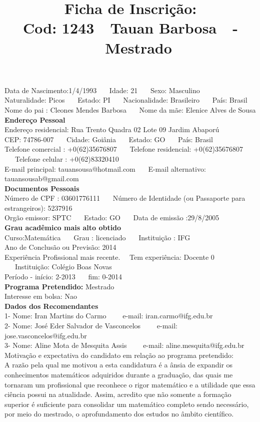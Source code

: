 \documentclass[11pt]{article}
\title{\vspace*{-4cm} Ficha de Inscrição: \\Cod: 1243\ \ Tauan Barbosa\ \ - \ \ Mestrado 
 }
\date{}
\begin{document}
\maketitle
\vspace*{-1.5cm}
\noindent Data de Nascimento:1/4/1993
\ \ \ Idade: 21   \ \ \ Sexo: Masculino
\\
Naturalidade: Picos   
\ \ \  Estado: PI
\ \ \  Nacionalidade: Brasileiro
\ \ \ País: Brasil
\\        
Nome do pai : Cleones Mendes Barbosa
\ \ \ Nome da mãe: Elenice Alves de Sousa          
\\[0.2cm]                     
\textbf{Endereço Pessoal} 
\\ 
\noindent Endereço residencial: Rua Trento Quadra 02 Lote 09 Jardim Abaporú
\\
        CEP: 74786-007 
\ \ \ Cidade: Goiânia 
\ \ \ Estado: GO 
\ \ \ País: Brasil
\\		
		Telefone comercial : +0(62)35676807
\ \ \ Telefone residencial: +0(62)35676807
\ \ \ Telefone celular : +0(62)83320410
\\
E-mail principal: tauansousa@hotmail.com
\ \ \ E-mail alternativo: tauansousab@gmail.com 
\\[0.2cm] 
\textbf{Documentos Pessoais}
\\
\noindent Número de CPF : 03601776111
\ \ \ Número de Identidade (ou Passaporte para estrangeiros): 5237916
\\
Orgão emissor: SPTC
\ \ \ Estado: GO
\ \ \ Data de emissão :29/8/2005
\\[0.3cm]
\textbf{Grau acadêmico mais alto obtido}
\\	
Curso:Matemática
\ \ \ Grau : licenciado
\ \ \ Instituição : IFG
\\			
Ano de Conclusão ou Previsão: 2014
\\ 
Experiência Profissional mais recente. \ \  
Tem experiência: Docente 0  
\ \ \ Instituição: Colégio Boas Novas
\\  
Período - início: 2-2013
\ \ \ fim: 0-2014
\\[0.2cm] 
\textbf{Programa Pretendido:} Mestrado\\
Interesse em bolsa: Nao
\\[0.3cm]		
\textbf{Dados dos Recomendantes} 
\\
1- Nome: Iran Martins do Carmo
\ \ \ \  e-mail: iran.carmo@ifg.edu.br 
\\
2- Nome: José Eder Salvador de Vasconcelos
\ \ \ \ e-mail: jose.vasconcelos@ifg.edu.br
\\
3- Nome: Aline Mota de Mesquita Assis
\ \ \ \ e-mail: aline.mesquita@ifg.edu.br
\\[0.2cm]
Motivação e expectativa do candidato em relação ao programa pretendido:
\\
A razão pela qual me motivou a esta candidatura é a ânsia de expandir os conhecimentos matemáticos adquiridos durante a graduação, das quais me tornaram um profissional que reconhece o rigor matemático e a utilidade que essa ciência possui na atualidade. Assim, acredito que não somente a formação superior é suficiente para consolidar um matemático completo sendo necessário, por meio do mestrado, o aprofundamento dos estudos no âmbito científico.
\end{document}
